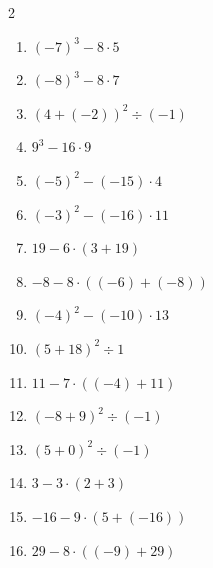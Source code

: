 \documentclass[11pt]{article}
\begin{document}
\begin{multicols}{2}
\begin{enumerate}
  \item $(-7)^{3} - 8 \cdot 5$
  \vspace{1.3cm}
  \item $(-8)^{3} - 8 \cdot 7$
  \vspace{1.3cm}
  \item $(4 + (-2))^{2} \div (-1)$
  \vspace{1.3cm}
  \item $9^{3} - 16 \cdot 9$
  \vspace{1.3cm}
  \item $(-5)^{2} - (-15) \cdot 4$
  \vspace{1.3cm}
  \item $(-3)^{2} - (-16) \cdot 11$
  \vspace{1.3cm}
  \item $19 - 6 \cdot (3 + 19)$
  \vspace{1.3cm}
  \item $-8 - 8 \cdot ((-6) + (-8))$
  \vspace{1.3cm}
  \item $(-4)^{2} - (-10) \cdot 13$
  \vspace{1.3cm}
  \item $(5 + 18)^{2} \div 1$
  \vspace{1.3cm}
  \item $11 - 7 \cdot ((-4) + 11)$
  \vspace{1.3cm}
  \item $(-8 + 9)^{2} \div (-1)$
  \vspace{1.3cm}
  \item $(5 + 0)^{2} \div (-1)$
  \vspace{1.3cm}
  \item $3 - 3 \cdot (2 + 3)$
  \vspace{1.3cm}
  \item $-16 - 9 \cdot (5 + (-16))$
  \vspace{1.3cm}
  \item $29 - 8 \cdot ((-9) + 29)$
  \vspace{1.3cm}
\end{enumerate}
\end{multicols}
\end{document}
